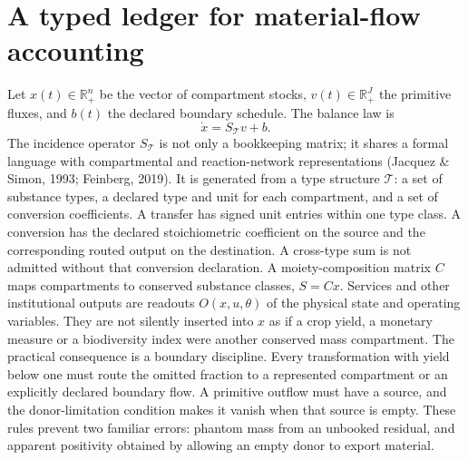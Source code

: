 \documentclass[11pt]{article}
\begin{document}
\section{A typed ledger for material-flow accounting}
Let \(x(t)\in\mathbb{R}_+^n\) be the vector of compartment stocks, \(v(t)\in\mathbb{R}_+^J\) the primitive fluxes, and \(b(t)\) the declared boundary schedule. The balance law is
\[\dot x = S_{\mathcal T}v+b.\]
The incidence operator \(S_{\mathcal T}\) is not only a bookkeeping matrix; it shares a formal language with compartmental and reaction-network representations (Jacquez \& Simon, 1993; Feinberg, 2019). It is generated from a type structure \(\mathcal T\): a set of substance types, a declared type and unit for each compartment, and a set of conversion coefficients. A transfer has signed unit entries within one type class. A conversion has the declared stoichiometric coefficient on the source and the corresponding routed output on the destination. A cross-type sum is not admitted without that conversion declaration.
A moiety-composition matrix \(C\) maps compartments to conserved substance classes, \(S=Cx\). Services and other institutional outputs are readouts \(O(x,u,\theta)\) of the physical state and operating variables. They are not silently inserted into \(x\) as if a crop yield, a monetary measure or a biodiversity index were another conserved mass compartment.
The practical consequence is a boundary discipline. Every transformation with yield below one must route the omitted fraction to a represented compartment or an explicitly declared boundary flow. A primitive outflow must have a source, and the donor-limitation condition makes it vanish when that source is empty. These rules prevent two familiar errors: phantom mass from an unbooked residual, and apparent positivity obtained by allowing an empty donor to export material.
\end{document}
